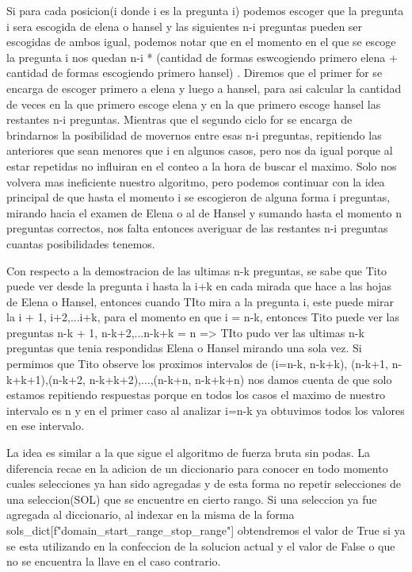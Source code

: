 \documentclass[a4paper, 12pt]{article}
\begin{document}
Si para cada posicion(i donde i es la pregunta i) podemos escoger que la pregunta i sera escogida de elena o hansel y las siguientes n-i preguntas pueden ser escogidas de ambos igual, podemos notar que en el momento en el que se escoge la pregunta i nos quedan n-i * (cantidad de formas eswcogiendo primero elena + cantidad de formas escogiendo primero hansel) .
Diremos que el primer for se encarga de escoger primero a elena y luego a hansel, para asi calcular la cantidad de veces en la que primero escoge elena y en la que primero escoge hansel las restantes n-i preguntas. Mientras que el segundo ciclo for se encarga de brindarnos la posibilidad de movernos entre esas n-i preguntas, repitiendo las anteriores que sean menores que i en algunos casos, pero nos da igual porque al estar repetidas no influiran en el conteo a la hora de buscar el maximo.
Solo nos volvera mas ineficiente nuestro algoritmo, pero podemos continuar con la idea principal de que hasta el momento i se escogieron de alguna forma i preguntas, mirando hacia el examen de Elena o al de Hansel y sumando hasta el momento n preguntas correctos, nos falta entonces averiguar de las restantes n-i preguntas cuantas posibilidades tenemos. 

Con respecto a la demostracion de las ultimas n-k preguntas, se sabe que Tito puede ver desde la pregunta i hasta la i+k en cada mirada que hace a las hojas de Elena o Hansel, entonces cuando TIto mira a la pregunta i, este puede mirar la i + 1, i+2,...i+k, para el momento en que i = n-k, entonces Tito puede ver las preguntas n-k + 1, n-k+2,...n-k+k = n => TIto pudo ver las ultimas n-k preguntas que tenia respondidas Elena o Hansel mirando una sola vez.
Si permimos que Tito observe los proximos intervalos de (i=n-k, n-k+k), (n-k+1, n-k+k+1),(n-k+2, n-k+k+2),...,(n-k+n, n-k+k+n) nos damos cuenta de que solo estamos repitiendo respuestas porque en todos los casos el maximo de nuestro intervalo es n y en el primer caso al analizar i=n-k ya obtuvimos todos los valores en ese intervalo.



La idea es similar a la que sigue el algoritmo de fuerza bruta sin podas. La diferencia recae en la adicion de un diccionario para conocer en todo momento cuales selecciones ya han sido agregadas y de esta forma no repetir selecciones de una seleccion(SOL) que se encuentre en cierto rango. Si una seleccion ya fue agregada al diccionario, al indexar en la misma de la forma sols_dict[f"{domain}_{start_range}_{stop_range}"] obtendremos el valor de True si ya se esta utilizando en la confeccion de la solucion actual y el valor de False o que no se encuentra la llave en el caso contrario.
\end{document}
